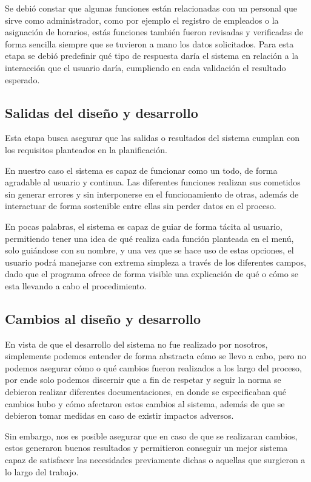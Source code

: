 \documentclass[12pt]{article}
\begin{document}
Se debió constar que algunas funciones están relacionadas con un personal que sirve como administrador, como por ejemplo el registro de empleados o la asignación de horarios, estás funciones también fueron revisadas y verificadas de forma sencilla siempre que se tuvieron a mano los datos solicitados. Para esta etapa se debió predefinir qué tipo de respuesta daría el sistema en relación a la interacción que el usuario daría, cumpliendo en cada validación el resultado esperado.

\subsection{Salidas del diseño y desarrollo}
Esta etapa busca asegurar que las salidas o resultados del sistema cumplan con los requisitos planteados en la planificación.

En nuestro caso el sistema es capaz de funcionar como un todo, de forma agradable al usuario y continua. Las diferentes funciones realizan sus cometidos sin generar errores y sin interponerse en el funcionamiento de otras, además de interactuar de forma sostenible entre ellas sin perder datos en el proceso.

En pocas palabras, el sistema es capaz de guiar de forma tácita al usuario, permitiendo tener una idea de qué realiza cada función planteada en el menú, solo guiándose con su nombre, y una vez que se hace uso de estas opciones, el usuario podrá manejarse con extrema simpleza a través de los diferentes campos, dado que el programa ofrece de forma visible una explicación de qué o cómo se esta llevando a cabo el procedimiento.

\subsection{Cambios al diseño y desarrollo}
En vista de que el desarrollo del sistema no fue realizado por nosotros, simplemente podemos entender de forma abstracta cómo se llevo a cabo, pero no podemos asegurar cómo o qué cambios fueron realizados a los largo del proceso, por ende solo podemos discernir que a fin de respetar y seguir la norma se debieron realizar diferentes documentaciones, en donde se especificaban qué cambios hubo y cómo afectaron estos cambios al sistema, además de que se debieron tomar medidas en caso de existir impactos adversos.

Sin embargo, nos es posible asegurar que en caso de que se realizaran cambios, estos generaron buenos resultados y permitieron conseguir un mejor sistema capaz de satisfacer las necesidades previamente dichas o aquellas que surgieron a lo largo del trabajo.
\end{document}
